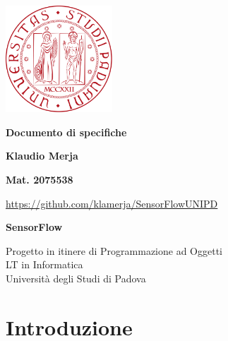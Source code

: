 \documentclass[a4paper, 10pt]{article}
\begin{document}
    \begin{titlepage}
        \begin{center}
            \includegraphics[width=0.3\textwidth]{./assets/LogoUNIPD.png}\\

            \vspace*{1cm}

            \Huge
            \textbf{Documento di specifiche}

            \vspace{1cm}

            \LARGE
            \textbf{Klaudio Merja}

            \vspace{0.2cm}

            \large
            \textbf{Mat. 2075538}

            \vspace{0.2cm}

            \url{https://github.com/klamerja/SensorFlowUNIPD}

            \vfill

            \LARGE
            \textbf{SensorFlow}

            \normalsize
            \vspace{0.8cm}
            Progetto in itinere di Programmazione ad Oggetti\\
            LT in Informatica\\
            Università degli Studi di Padova
        \end{center}
    \end{titlepage}
    \section{Introduzione}
\end{document}
